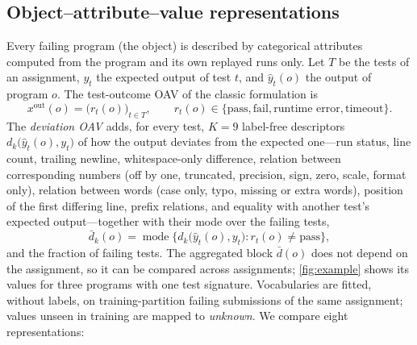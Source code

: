 \subsection{Object--attribute--value representations}\label{sec:reps}
Every failing program (the object) is described by categorical attributes computed from the program and its own replayed runs only. Let $T$ be the tests of an assignment, $y_t$ the expected output of test $t$, and $\hat y_t(o)$ the output of program $o$. The test-outcome OAV of the classic formulation is
\begin{equation}
x^{\mathrm{out}}(o) = \bigl(r_t(o)\bigr)_{t \in T}, \qquad r_t(o) \in \{\text{pass}, \text{fail}, \text{runtime error}, \text{timeout}\}.
\end{equation}
The \emph{deviation OAV} adds, for every test, $K = 9$ label-free descriptors $d_k\bigl(\hat y_t(o), y_t\bigr)$ of how the output deviates from the expected one---run status, line count, trailing newline, whitespace-only difference, relation between corresponding numbers (off by one, truncated, precision, sign, zero, scale, format only), relation between words (case only, typo, missing or extra words), position of the first differing line, prefix relations, and equality with another test's expected output---together with their mode over the failing tests,
\begin{equation}
\bar d_k(o) = \operatorname{mode}\bigl\{ d_k\bigl(\hat y_t(o), y_t\bigr) : r_t(o) \neq \text{pass} \bigr\},
\end{equation}
and the fraction of failing tests. The aggregated block $\bar d(o)$ does not depend on the assignment, so it can be compared across assignments; \cref{fig:example} shows its values for three programs with one test signature. Vocabularies are fitted, without labels, on training-partition failing submissions of the same assignment; values unseen in training are mapped to \emph{unknown}. We compare eight representations:
